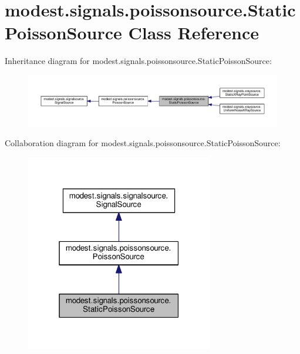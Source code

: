 \hypertarget{classmodest_1_1signals_1_1poissonsource_1_1StaticPoissonSource}{}\section{modest.\+signals.\+poissonsource.\+Static\+Poisson\+Source Class Reference}
\label{classmodest_1_1signals_1_1poissonsource_1_1StaticPoissonSource}


Inheritance diagram for modest.\+signals.\+poissonsource.\+Static\+Poisson\+Source\+:
\nopagebreak
\begin{figure}[H]
\begin{center}
\leavevmode
\includegraphics[width=350pt]{classmodest_1_1signals_1_1poissonsource_1_1StaticPoissonSource__inherit__graph}
\end{center}
\end{figure}


Collaboration diagram for modest.\+signals.\+poissonsource.\+Static\+Poisson\+Source\+:
\nopagebreak
\begin{figure}[H]
\begin{center}
\leavevmode
\includegraphics[width=232pt]{classmodest_1_1signals_1_1poissonsource_1_1StaticPoissonSource__coll__graph}
\end{center}
\end{figure}
